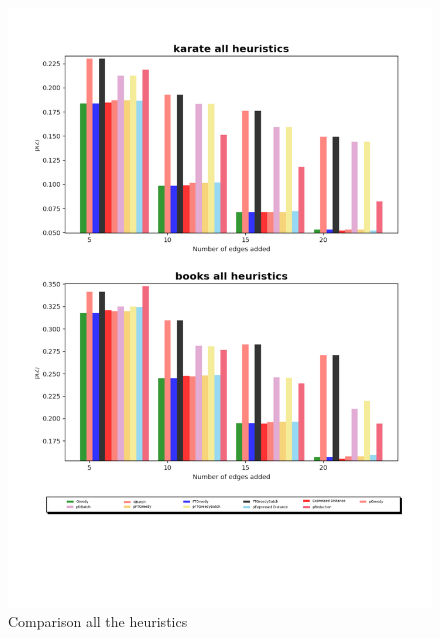 \begin{figure}[!htbp]
	\begin{center}
	\advance\leftskip-1.3cm
	\captionsetup{justification=centering,margin=2cm}
	\includegraphics[width=1\textwidth]{Figures/all1}
	\caption{Comparison all the heuristics}
	\end{center}
	\label{all1}
\end{figure}

\clearpage

